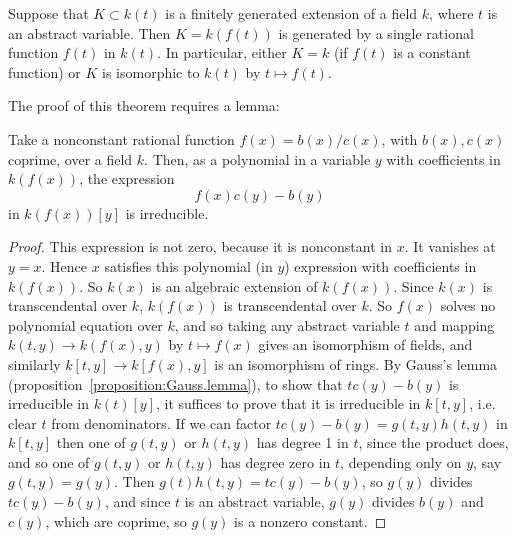 \begin{theorem}
Suppose that \(K \subset k(t)\) is a finitely generated extension of a field \(k\), where \(t\) is an abstract variable.
Then \(K=k(f(t))\) is generated by a single rational function \(f(t)\) in \(k(t)\).
In particular, either \(K=k\) (if \(f(t)\) is a constant function) or \(K\) is isomorphic to \(k(t)\) by \(t \mapsto f(t)\).
\end{theorem}
The proof of this theorem requires a lemma:
\begin{lemma}
Take a nonconstant rational function \(f(x)=b(x)/c(x)\), with \(b(x), c(x)\) coprime, over a field \(k\).
Then, as a polynomial in a variable \(y\) with coefficients in \(k(f(x))\), the expression
\[
f(x)c(y)-b(y) 
\]
in \(k(f(x))[y]\) is irreducible.
\end{lemma}
\begin{proof}
This expression is not zero, because it is nonconstant in \(x\).
It vanishes at \(y=x\).
Hence \(x\) satisfies this polynomial (in \(y\)) expression with coefficients in \(k(f(x))\).
So \(k(x)\) is an algebraic extension of \(k(f(x))\).
Since \(k(x)\) is transcendental over \(k\), \(k(f(x))\) is transcendental over \(k\).
So \(f(x)\) solves no polynomial equation over \(k\), and so taking any abstract variable \(t\) and mapping \(k(t,y) \to k(f(x),y)\) by \(t \mapsto f(x)\) gives an isomorphism of fields, and similarly \(k[t,y] \to k[f(x),y]\) is an isomorphism of rings.
By Gauss's lemma (proposition~\vref{proposition:Gauss.lemma}), to show that \(tc(y)-b(y)\) is irreducible in \(k(t)[y]\), it suffices to prove that it is irreducible in \(k[t,y]\), i.e. clear \(t\) from denominators.
If we can factor \(tc(y)-b(y)=g(t,y)h(t,y)\) in \(k[t,y]\) then one of \(g(t,y)\) or \(h(t,y)\) has degree 1 in \(t\), since the product does, and so one of \(g(t,y)\) or \(h(t,y)\) has degree zero in \(t\), depending only on \(y\), say \(g(t,y)=g(y)\).
Then \(g(t)h(t,y)=tc(y)-b(y)\), so \(g(y)\) divides \(tc(y)-b(y)\), and since \(t\) is an abstract variable, \(g(y)\) divides \(b(y)\) and \(c(y)\), which are coprime, so \(g(y)\) is a nonzero constant.
\end{proof}

